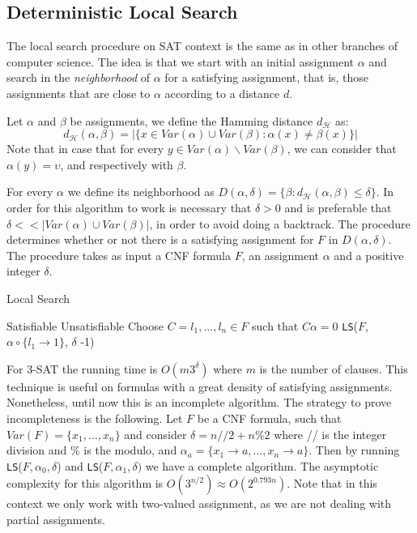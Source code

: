 \subsection{Deterministic Local Search}

The local search procedure on SAT context is the same as in other branches of computer science. The idea is that we start with an initial assignment $\alpha$ and search in the \emph{neighborhood} of $\alpha$ for a satisfying assignment, that is, those assignments that are close to $\alpha$ according to a distance $d$. 

\begin{definition}
  Let $\alpha$ and $\beta$ be assignments, we define the Hamming distance $d_\mathcal{H}$ as:
  $$d_\mathcal{H}(\alpha,\beta) =  | \{ x \in Var(\alpha) \cup Var(\beta) : \alpha(x) \ne \beta(x) \} |$$
  Note that in case that for every $y \in Var(\alpha) \backslash Var(\beta)$, we can  consider that $\alpha(y) = \upsilon$, and respectively with $\beta$.
\end{definition}

For every $\alpha$ we define its neighborhood as $D(\alpha,\delta) = \{\beta : d_\mathcal{H}(\alpha,\beta) \le \delta\}$. In order for this algorithm to work is necessary that $\delta > 0$ and is preferable that $\delta << |Var(\alpha) \cup Var(\beta)|$, in order to avoid doing a backtrack. The procedure determines whether or not there is a satisfying assignment for $F$ in $D(\alpha,\delta)$. The procedure takes as input a CNF formula $F$, an assignment $\alpha$ and a positive integer $\delta$.

\begin{algorithm}
  \caption{Local Search\cite{schoning2013satisfiability}}\label{ds}
  \begin{algorithmic}[1]
     \Return Satisfiable
    \EndIf
     \Return Unsatisfiable 
    \EndIf
    \State Choose $C={l_1,...,l_n}\in F$ such that $C\alpha=0$
  \State \Return \texttt{LS}($F$, $\alpha\circ\{l_1 \to 1\}$, $\delta$ -1)
  \EndFor
  \EndProcedure
\end{algorithmic}
\end{algorithm}


For 3-SAT the running time is $O(m3^\delta)$ where $m$ is the number of clauses. This technique is useful on formulas with a great density of satisfying assignments. Nonetheless, until now this is an incomplete algorithm. The strategy to prove incompleteness is the following. Let $F$ be a CNF formula, such that $Var(F)=\{x_1,...,x_n\}$ and consider $\delta = n//2+n\%2$ where // is the integer division and \% is the modulo, and $\alpha_a = \{x_1 \to a,...,x_n\to a\}$. Then by running \texttt{LS}($F,\alpha_0,\delta$) and \texttt{LS}($F,\alpha_1,\delta)$ we have a complete algorithm. The asymptotic complexity for this algorithm is $O(3^{n/2}) \approx O(2^{0.793n})$. Note that in this context we only work with two-valued assignment, as we are not dealing with partial assignments.\\

